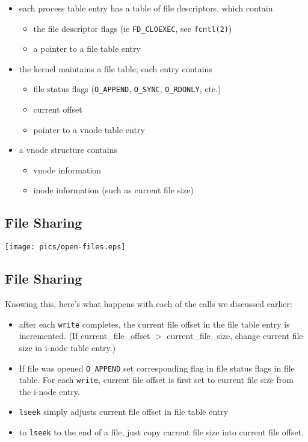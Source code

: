\documentclass[xga]{xdvislides}
\begin{document}
\begin{itemize}
	\item each process table entry has a table of file descriptors, which
		contain
		\begin{itemize}
			\item the file descriptor flags (ie {\tt FD\_CLOEXEC}, see \verb+fcntl(2)+)
			\item a pointer to a file table entry
		\end{itemize}
	\item the kernel maintains a file table;  each entry contains
		\begin{itemize}
			\item file status flags (\verb+O_APPEND+, \verb+O_SYNC+, \verb+O_RDONLY+, etc.)
			\item current offset
			\item pointer to a vnode table entry
		\end{itemize}
	\item a vnode structure contains
		\begin{itemize}
			\item vnode information
			\item inode information (such as current file size)
		\end{itemize}
\end{itemize}

\subsection{File Sharing}
\begin{center}
\texttt{[image: pics/open-files.eps]} \\
\end{center}

\subsection{File Sharing}
Knowing this, here's what happens with each of the calls we discussed earlier:

\begin{itemize}
	\item after each {\tt write} completes, the current file offset in the
		file table entry is incremented.  (If current\_file\_offset $>$
		current\_file\_size, change current file size in i-node table entry.)
	\item If file was opened {\tt O\_APPEND} set corresponding flag in file status
		flags in file table. For each {\tt write}, current file offset is first set to
		current file size from the i-node entry.
	\item {\tt lseek} simply adjusts current file offset in file table entry
	\item to {\tt lseek} to the end of a file, just copy current file size into
		current file offset.
\end{itemize}
\end{document}
